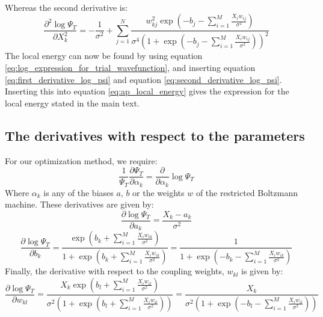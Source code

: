 \documentclass[a4paper, 10pt]{article}
\begin{document}
\begin{appendices}
\begin{equation}
\begin{split}
	\end{split}
	\end{equation}
	Whereas the second derivative is:
	\begin{equation}\label{eq:second_derivative_log_psi}
	\frac{\partial^2 \log \Psi_T}{\partial X_k^2}=-\frac{1}{\sigma^2}+\sum_{j=1}^N \frac{w_{kj}^2 \exp \left(-b_j-\sum_{i=1}^{M}\frac{X_iw_{ij}}{\sigma^2} \right)}{\sigma^4\left(1+ \exp \left(-b_j-\sum_{i=1}^{M} \frac{X_iw_{ij}}{\sigma^2}\right)\right)^2}
	\end{equation}
	The local energy can now be found by using equation \ref{eq:log_expression_for_trial_wavefunction}, and inserting equation \ref{eq:first_derivative_log_psi} and equation \ref{eq:second_derivative_log_psi}. Inserting this into equation \ref{eq:ap_local_energy} gives the expression for the local energy stated in the main text.
	\subsection{The derivatives with respect to the parameters}\label{ap:derivative_parameters}
	For our optimization method, we require:
	\begin{equation}
	\frac{1}{\Psi_T}\frac{\partial \Psi_T}{\partial \alpha_k}=\frac{\partial }{\partial \alpha_k}\log \Psi_T
	\end{equation}
	Where $\alpha_k$ is any of the biases $a$, $b$ or the weights $w$ of the restricted Boltzmann machine. These derivatives are given by:
	\begin{equation}
	\frac{\partial \log \Psi_T }{\partial a_k}=\frac{X_k-a_k}{\sigma^2}
	\end{equation}
	\begin{equation}
	\frac{\partial \log \Psi_T}{\partial b_k}=\frac{\exp \left(b_k+\sum_{i=1}^M \frac{X_iw_{ik}}{\sigma^2}\right)}{1+\exp \left(b_k+\sum_{i=1}^M \frac{X_iw_{ik}}{\sigma^2}\right)}=\frac{1}{1+\exp \left(-b_k-\sum_{i=1}^M \frac{X_i w_{ik}}{\sigma^2}\right)}
	\end{equation}
	Finally, the derivative with respect to the coupling weights, $w_{kl}$ is given by:
	\begin{equation}
	\frac{\partial \log \Psi_T}{\partial w_{kl}}=\frac{X_k\exp\left(b_l+\sum_{i=1}^M \frac{X_iw_{il}}{\sigma^2}\right)}{\sigma^2\left(1+\exp \left( b_l + \sum_{i=1}^M \frac{X_iw_{il}}{\sigma^2}\right)\right)}=\frac{X_k}{\sigma^2\left(1+\exp \left(-b_l-\sum_{i=1}^M \frac{X_iw_{il}}{\sigma^2}\right)\right)}
	\end{equation}

\end{appendices}
\end{document}
